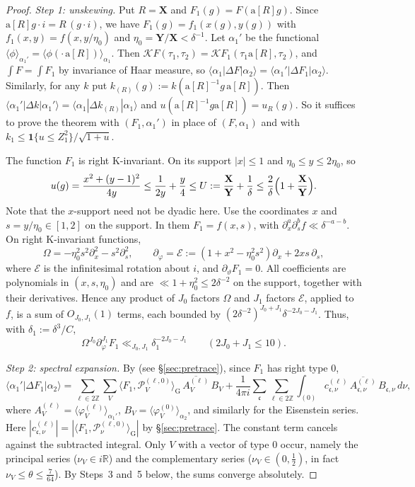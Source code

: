 \documentclass[11pt]{amsart}
\theoremstyle{remark}
\theoremstyle{definition}
\numberwithin{equation}{section}
\newcommand{\Z}{\mathbb{Z}}
\newcommand{\R}{\mathbb{R}}
\newcommand{\G}{\mathrm{G}}
\newcommand{\K}{\mathrm{K}}
\newcommand{\one}{\mathbf{1}}
\newcommand{\br}[1]{\langle #1\rangle}
\newcommand{\bX}{\mathbf{X}}
\newcommand{\bY}{\mathbf{Y}}
\newcommand{\Pc}{\mathcal{P}}
\newcommand{\Kc}{\mathcal{K}}
\newcommand{\ra}{\mathrm{a}}
\begin{document}
\begin{proof}
\emph{Step 1: unskewing.} Put $R=\bX$ and $F_1(g)=F(\ra[R]g)$. Since $\ra[R]g\cdot i=R\,(g\cdot i)$, we have $F_1(g)=f_1(x(g),y(g))$ with $f_1(x,y)=f(x,y/\eta_0)$ and $\eta_0=\bY/\bX<\delta^{-1}$. Let $\alpha_1'$ be the functional $\br{\phi}_{\alpha_1'}=\br{\phi(\cdot\,\ra[R])}_{\alpha_1}$. Then $\Kc F(\tau_1,\tau_2)=\Kc F_1(\tau_1\ra[R],\tau_2)$, and $\int F=\int F_1$ by invariance of Haar measure, so $\br{\alpha_1|\Delta F|\alpha_2}=\br{\alpha_1'|\Delta F_1|\alpha_2}$. Similarly, for any $k$ put $k_{(R)}(g):=k(\ra[R]^{-1}g\,\ra[R])$. Then $\br{\alpha_1'|\Delta k|\alpha_1'}=\br{\alpha_1|\Delta k_{(R)}|\alpha_1}$ and $u(\ra[R]^{-1}g\ra[R])=u_R(g)$. So it suffices to prove the theorem with $(F_1,\alpha_1')$ in place of $(F,\alpha_1)$ and with $k_1\le\one\{u\le Z_1^2\}/\sqrt{1+u}$.

The function $F_1$ is right $\K$-invariant. On its support $|x|\le1$ and $\eta_0\le y\le2\eta_0$, so
\[
u(g)=\frac{x^2+(y-1)^2}{4y}\le\frac1{2y}+\frac y4\le U:=\frac{\bX}{\bY}+\frac1\delta\le\frac2\delta\Bigl(1+\frac{\bX}{\bY}\Bigr).
\]
Note that the $x$-support need not be dyadic here. Use the coordinates $x$ and $s=y/\eta_0\in[1,2]$ on the support. In them $F_1=f(x,s)$, with $\partial_x^a\partial_s^bf\ll\delta^{-a-b}$. On right $\K$-invariant functions,
\[
\Omega=-\eta_0^2s^2\partial_x^2-s^2\partial_s^2,\qquad\partial_\varphi=\mathcal E:=(1+x^2-\eta_0^2s^2)\partial_x+2xs\,\partial_s,
\]
where $\mathcal E$ is the infinitesimal rotation about $i$, and $\partial_\vartheta F_1=0$. All coefficients are polynomials in $(x,s,\eta_0)$ and are $\ll1+\eta_0^2\le2\delta^{-2}$ on the support, together with their derivatives. Hence any product of $J_0$ factors $\Omega$ and $J_1$ factors $\mathcal E$, applied to $f$, is a sum of $O_{J_0,J_1}(1)$ terms, each bounded by $(2\delta^{-2})^{J_0+J_1}\delta^{-2J_0-J_1}$. Thus, with $\delta_1:=\delta^3/C$,
\begin{equation}\label{eq:51}
\Omega^{J_0}\partial_\varphi^{J_1}F_1\ll_{J_0,J_1}\delta_1^{-2J_0-J_1}\qquad(2J_0+J_1\le10).
\end{equation}

\emph{Step 2: spectral expansion.} By \cite[Proposition~3.1]{GM1} (see \S\ref{sec:pretrace}), since $F_1$ has right type $0$,
\begin{equation}\label{eq:expansion}
\br{\alpha_1'|\Delta F_1|\alpha_2}=\sum_{\ell\in2\Z}\sum_{V}\br{F_1,\Pc_V^{(\ell,0)}}_\G\,\overline{A_V^{(\ell)}}\,B_V+\frac1{4\pi i}\sum_{\mathfrak c}\sum_{\ell\in2\Z}\int_{(0)}c_{\mathfrak c,\nu}^{(\ell)}\,\overline{A_{\mathfrak c,\nu}^{(\ell)}}\,B_{\mathfrak c,\nu}\,d\nu,
\end{equation}
where $A_V^{(\ell)}=\br{\varphi_V^{(\ell)}}_{\alpha_1'}$, $B_V=\br{\varphi_V^{(0)}}_{\alpha_2}$, and similarly for the Eisenstein series. Here $|c_{\mathfrak c,\nu}^{(\ell)}|=|\br{F_1,\Pc_\nu^{(\ell,0)}}_\G|$ by \S\ref{sec:pretrace}. The constant term cancels against the subtracted integral. Only $V$ with a vector of type $0$ occur, namely the principal series ($\nu_V\in i\R$) and the complementary series ($\nu_V\in(0,\frac12)$, in fact $\nu_V\le\theta\le\frac7{64}$). By Steps~3 and~5 below, the sums converge absolutely.


\end{proof}
\end{document}
